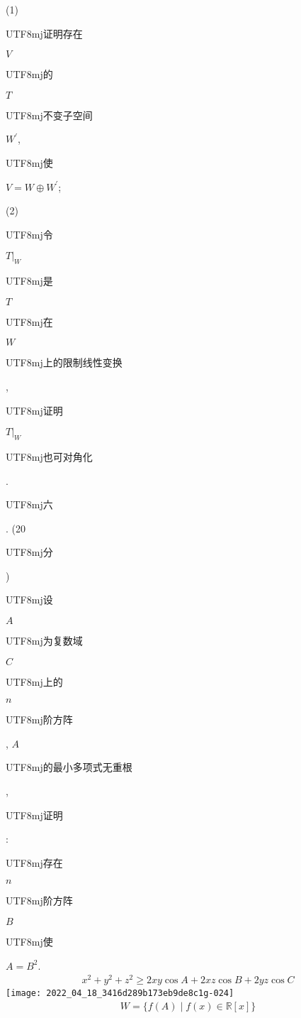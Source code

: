 \documentclass[10pt]{article}
\begin{document}
(1) \begin{CJK}{UTF8}{mj}证明存在\end{CJK} $V$ \begin{CJK}{UTF8}{mj}的\end{CJK} $T$ \begin{CJK}{UTF8}{mj}不变子空间\end{CJK} $W^{\prime}$, \begin{CJK}{UTF8}{mj}使\end{CJK} $V=W \oplus W^{\prime}$;

(2) \begin{CJK}{UTF8}{mj}令\end{CJK} $\left.T\right|_{W}$ \begin{CJK}{UTF8}{mj}是\end{CJK} $T$ \begin{CJK}{UTF8}{mj}在\end{CJK} $W$ \begin{CJK}{UTF8}{mj}上的限制线性变换\end{CJK}, \begin{CJK}{UTF8}{mj}证明\end{CJK} $\left.T\right|_{W}$ \begin{CJK}{UTF8}{mj}也可对角化\end{CJK}.

\begin{CJK}{UTF8}{mj}六\end{CJK}. (20 \begin{CJK}{UTF8}{mj}分\end{CJK}) \begin{CJK}{UTF8}{mj}设\end{CJK} $A$ \begin{CJK}{UTF8}{mj}为复数域\end{CJK} $C$ \begin{CJK}{UTF8}{mj}上的\end{CJK} $n$ \begin{CJK}{UTF8}{mj}阶方阵\end{CJK}, $A$ \begin{CJK}{UTF8}{mj}的最小多项式无重根\end{CJK}, \begin{CJK}{UTF8}{mj}证明\end{CJK}: \begin{CJK}{UTF8}{mj}存在\end{CJK} $n$ \begin{CJK}{UTF8}{mj}阶方阵\end{CJK} $B$ \begin{CJK}{UTF8}{mj}使\end{CJK} $A=B^{2}$.
$$
\begin{aligned}
& x^{2}+y^{2}+z^{2} \geqslant 2 x y \cos A+2 x z \cos B+2 y z \cos C
\end{aligned}
$$
\texttt{[image: 2022\_04\_18\_3416d289b173eb9de8c1g-024]}
$$
\begin{aligned}
& W=\{f(A) \mid f(x) \in \mathbb{R}[x]\} 
\end{aligned}
$$
\end{document}
